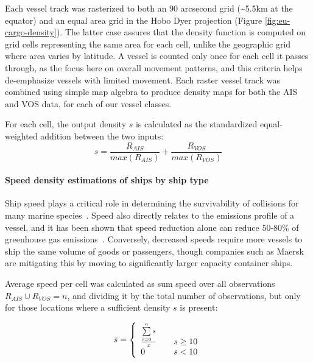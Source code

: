 Each vessel track was rasterized to both an 90 arcsecond grid (\textasciitilde{}5.5km at the equator) and an equal area grid in the Hobo Dyer projection (Figure \ref{fig:eu-cargo-density}). The latter case assures that the density function is computed on grid cells representing the same area for each cell, unlike the geographic grid where area varies by latitude. A vessel is counted only once for each cell it passes through, as the focus here on overall movement patterns, and this criteria helps de-emphasize vessels with limited movement. Each raster vessel track was combined using simple map algebra to produce density maps for both the AIS and VOS data, for each of our vessel classes. %

For each cell, the output density $s$ is calculated as the standardized equal-weighted addition between the two inputs:
\begin{equation}
 s = \frac{R_{AIS}}{max(R_{AIS})} + \frac{R_{VOS}}{max(R_{VOS})} 
\end{equation}

\paragraph{Speed density estimations of ships by ship type}
\label{ref:ship-density-estimates}
Ship speed plays a critical role in determining the survivability of collisions for many marine species~\citep{Vanderlaan2009}. Speed also directly relates to the emissions profile of a vessel, and it has been shown that speed reduction alone can reduce 50-80\% of greenhouse gas emissions~\citep{lack2011impact}. Conversely, decreased speeds require more vessels to ship the same volume of goods or passengers, though companies such as Maersk are mitigating this by moving to significantly larger capacity container ships. 

Average speed per cell was calculated as sum speed over all observations $R_{AIS} \cup R_{VOS} = n$, and dividing it by the total number of observations, but only for those locations where a sufficient density $s$ is present: 

\begin{equation}
 \bar{s} = \left\{
   \begin{array}{l l}
    \frac{\sum\limits_{i=0}^n s}{x} & \quad \text{$s \ge 10$}\\
    0 & \quad \text {$s < 10$}
   \end{array}\right.
\end{equation}

